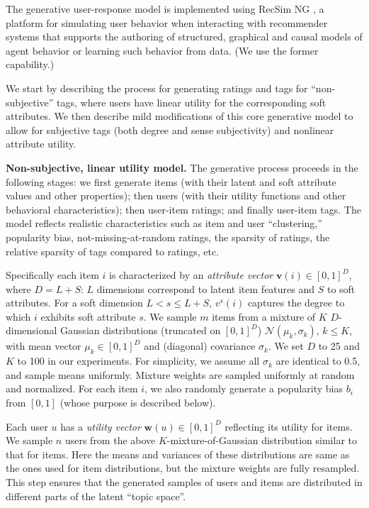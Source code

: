 \documentclass[manuscript,screen,nonacm]{acmart}
\newcommand{\1}{{\mathbf 1}}
\newcommand{\bfv}{\mathbf{v}}
\newcommand{\bfw}{\mathbf{w}}
\newcommand{\calN}{\mathcal{N}}
\theoremstyle{TheoremNum}
\begin{document}
The generative user-response model  is implemented using RecSim NG \cite{mladenov2020recsimng}, a platform for simulating user behavior when interacting with recommender systems that supports the authoring of structured, graphical and causal models of agent behavior or learning such behavior from data. (We use the former capability.)

We start by describing the process for generating ratings and tags for ``non-subjective'' tags, where users have linear utility for the corresponding soft attributes. We then describe mild modifications of this core generative model to allow for subjective tags (both degree and sense subjectivity) and nonlinear attribute utility.

\vskip 2mm
\noindent
\textbf{Non-subjective, linear utility model.} \hspace*{2mm}
The generative process proceeds in the following stages: we first generate items (with their latent and soft attribute values and other properties); then users (with their utility functions and other behavioral characteristics); then user-item ratings; and finally user-item tags. The model reflects realistic characteristics such as item and user ``clustering,'' popularity bias, not-missing-at-random ratings, the sparsity of ratings, the relative sparsity of tags compared to ratings, etc.

Specifically each item $i$ is characterized by an \emph{attribute vector} $\bfv(i)\in [0,1]^D$, where $D = L+S$: $L$ dimensions correspond to latent item features and $S$ to soft attributes. For a soft dimension $L < s \leq L+S$, $v^s(i)$ captures the degree to which $i$ exhibits soft attribute $s$. We sample $m$ items from a mixture of $K$ $D$-dimensional Gaussian distributions (truncated on $[0,1]^D$) $\calN(\mu_k, \sigma_k)$, $k\leq K$, with mean vector $\mu_k \in [0,1]^D$ and (diagonal) covariance $\sigma_k$. We set $D$ to 25 and $K$ to 100 in our experiments. For simplicity, we assume all $\sigma_k$ are identical to 0.5, and sample means uniformly. Mixture weights are sampled uniformly at random and normalized.
For each item $i$, we also randomly generate a popularity bias $b_i$ from $[0,1]$ (whose purpose is described below).

Each user $u$ has a \emph{utility vector} $\bfw(u)\in [0,1]^D$ reflecting its utility for items. We sample $n$ users from the above $K$-mixture-of-Gaussian distribution similar to that for items. Here the means and variances of these distributions are same as the ones used for item distributions,
but the mixture weights are fully resampled. This step ensures that the generated samples of users and items are distributed in different parts of the latent ``topic space''.
\end{document}
